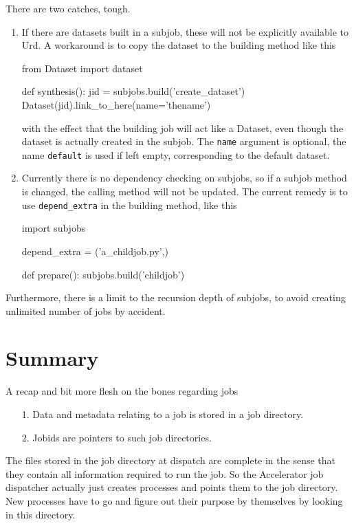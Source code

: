 There are two catches, tough.
\begin{enumerate}
  \item
If there are datasets built in a subjob,
these will not be explicitly available to Urd.  A workaround is to
copy the dataset to the building method like this
\begin{python}
from Dataset import dataset

def synthesis():
    jid = subjobs.build('create_dataset')
    Dataset(jid).link_to_here(name='thename')
\end{python}
with the effect that the building job will act like a Dataset, even
though the dataset is actually created in the subjob.  The
\texttt{name} argument is optional, the name \texttt{default} is used
if left empty, corresponding to the default dataset.

\item
Currently there is no dependency checking on subjobs, so if a subjob
method is changed, the calling method will not be updated.  The
current remedy is to use \texttt{depend\_extra} in the building
method, like this
\begin{python}
import subjobs

depend_extra = ('a_childjob.py',)

def prepare():
  subjobs.build('childjob')
\end{python}
\end{enumerate}
Furthermore, there is a limit to the recursion depth of subjobs, to
avoid creating unlimited number of jobs by accident.



\clearpage
\section{Summary}
A recap and bit more flesh on the bones regarding jobs
\begin{itemize}
\item[1.]  Data and metadata relating to a job is stored in a job directory.
\item[2.]  Jobids are pointers to such job directories.
\end{itemize}
The files stored in the job directory at dispatch are complete in the
sense that they contain all information required to run the job.  So
the Accelerator job dispatcher actually just creates processes and
points them to the job directory.  New processes have to go and figure
out their purpose by themselves by looking in this directory.

